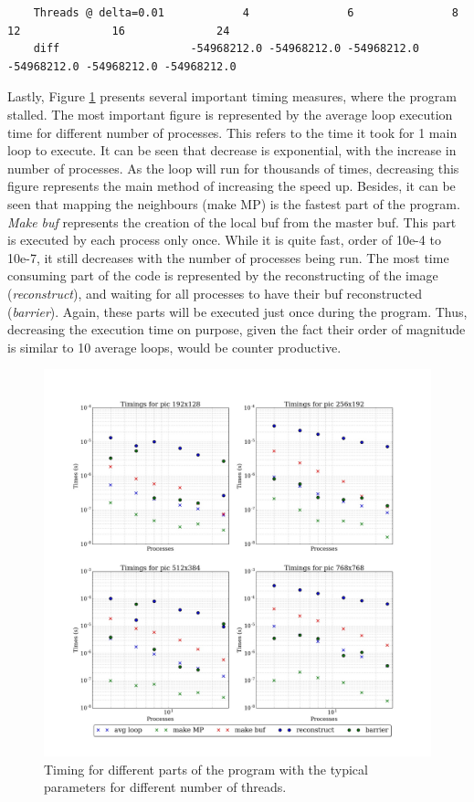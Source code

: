 \documentclass[11pt]{article}
\begin{document}
	\begin{lstlisting}
	Threads @ delta=0.01 			4 				6 				8 				12 				16 				24 
	diff					-54968212.0	-54968212.0	-54968212.0	-54968212.0	-54968212.0	-54968212.0
	\end{lstlisting}
	
	Lastly, Figure \ref{tim1} presents several important timing measures, where the program stalled. The most important figure is represented by the average loop execution time for different number of processes. This refers to the time it took for 1 main loop to execute. It can be seen that decrease is exponential, with the increase in number of processes. As the loop will run for thousands of times, decreasing this figure represents the main method of increasing the speed up. Besides, it can be seen that mapping the neighbours (make MP) is the fastest part of the program. \textit{Make buf} represents the creation of the local buf from the master buf. This part is executed by each process only once. While it is quite fast, order of 10e-4 to 10e-7, it still decreases with the number of processes being run. The most time consuming part of the code is represented by the reconstructing of the image (\textit{reconstruct}), and waiting for all processes to have their buf reconstructed (\textit{barrier}). Again, these parts will be executed just once during the program. Thus, decreasing the execution time on purpose, given the fact their order of magnitude is similar to 10 average loops, would be counter productive. 
	
	
	\begin{figure}[H]	
		\centering
		\includegraphics[scale=.3, width=\textwidth ]{timings.jpeg}
		\caption{Timing for different parts of the program with the typical parameters for different number of threads.}\label{tim1}
	\end{figure}
	
\end{document}
